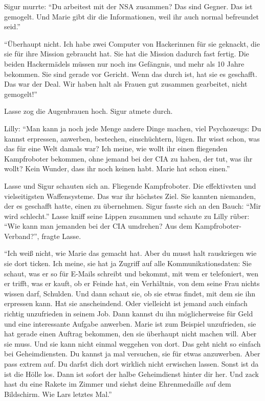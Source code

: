 {Sigur murrte: \enquote{Du arbeitest mit der NSA zusammen? Das sind Gegner.
Das ist gemogelt.
Und Marie gibt dir die Informationen, weil ihr auch normal befreundet seid.}

\enquote{Überhaupt nicht.
Ich habe zwei Computer von Hackerinnen für sie geknackt, die sie für ihre Mission gebraucht hat.
Sie hat die Mission dadurch fast fertig.
Die beiden Hackermädels müssen nur noch ins Gefängnis, und mehr als 10 Jahre bekommen.
Sie sind gerade vor Gericht.
Wenn das durch ist, hat sie es geschafft.
Das war der Deal.
Wir haben halt als Frauen gut zusammen gearbeitet, nicht gemogelt!}

Lasse zog die Augenbrauen hoch. Sigur atmete durch.

Lilly: \enquote{Man kann ja noch jede Menge andere Dinge machen, viel Psychozeugs:
Du kannst erpressen, anwerben, bestechen, einschüchtern, lügen.
Ihr wisst schon, was das für eine Welt damals war?
Ich meine, wie wollt ihr einen fliegenden Kampfroboter bekommen, ohne jemand bei der CIA zu haben, der tut, was ihr wollt?
Kein Wunder, dass ihr noch keinen habt.
Marie hat schon einen.}

Lasse und Sigur schauten sich an.
Fliegende Kampfroboter.
Die effektivsten und vielseitigsten Waffensysteme.
Das war ihr höchstes Ziel.
Sie kannten niemanden, der es geschafft hatte, einen zu übernehmen.
Sigur fasste sich an den Bauch: \enquote{Mir wird schlecht.}
Lasse kniff seine Lippen zusammen und schaute zu Lilly rüber: \enquote{Wie kann man jemanden bei der CIA umdrehen?
Aus dem Kampfroboter-Verband?}, fragte Lasse.

\enquote{Ich weiß nicht, wie Marie das gemacht hat.
Aber du musst halt rauskriegen wie sie dort ticken.
Ich meine, sie hat ja Zugriff auf alle Kommunikationsdaten: Sie schaut, was er so für E-Mails schreibt und bekommt, mit wem er telefoniert, wen er trifft, was er kauft, ob er Feinde hat, ein Verhältnis, von dem seine Frau nichts wissen darf, Schulden.
Und dann schaut sie, ob sie etwas findet, mit dem sie ihn erpressen kann.
Hat sie anscheindend.
Oder vielleicht ist jemand auch einfach richtig unzufrieden in seinem Job.
Dann kannst du ihn möglicherweise für Geld und eine interessante Aufgabe anwerben.
Marie ist zum Beispiel unzufrieden, sie hat gerade einen Auftrag bekommen, den sie überhaupt nicht machen will.
Aber sie muss.
Und sie kann nicht einmal weggehen von dort.
Das geht nicht so einfach bei Geheimdiensten.
Du kannst ja mal versuchen, sie für etwas anzuwerben.
Aber pass extrem auf.
Du darfst dich dort wirklich nicht erwischen lassen.
Sonst ist da ist die Hölle los.
Dann ist sofort der halbe Geheimdienst hinter dir her.
Und zack hast du eine Rakete im Zimmer und siehst deine Ehrenmedaille auf dem Bildschirm.
Wie Lars letztes Mal.}

}
